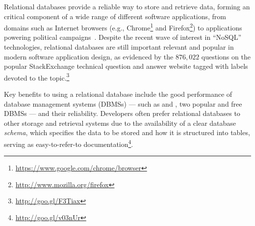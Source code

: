 %
%
%
%

\begin{sloppypar}
  Relational databases provide a reliable way to store and retrieve data, forming an critical component of a wide range of different software applications, from domains such as Internet browsers (e.g., Chrome\footnote{\small{\url{https://www.google.com/chrome/browser}}} and Firefox\footnote{\small{\url{http://www.mozilla.org/firefox}}}) to applications powering political campaigns~\cite{Butler2012}. Despite the recent wave of interest in ``NoSQL'' technologies, relational databases are still important relevant and popular in modern software application design, as evidenced by the $876,022$ questions on the popular StackExchange technical question and answer website tagged with labels devoted to the topic.\footnote{\small{\url{http://goo.gl/F3Tiax}}}
\end{sloppypar}

Key benefits to using a relational database include the good performance of database management systems (DBMSs) \cite{Abrahami2015} --- such as \Postgres and \SQLite, two popular and free DBMSs --- and their reliability. Developers often prefer relational databases to other storage and retrieval systems due to the availability of a clear database {\it schema}, which specifies the data to be stored and how it is structured into tables, serving as easy-to-refer-to documentation\footnote{\small{\url{http://goo.gl/v03nUr}}}\hspace{-1ex}. %

